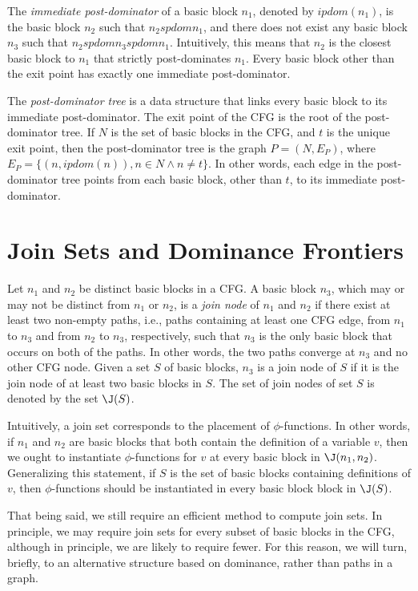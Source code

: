 The \emph{immediate post-dominator} of a basic block $n_{1}$, denoted by
$ipdom(n_{1})$, is the basic block $n_{2}$ such that $n_{2} spdom n_{1}$, and
there does not exist any basic block $n_{3}$ such that
$n_{2} spdom n_{3} spdom n_{1}$. Intuitively, this means that $n_{2}$ is the
closest basic block to $n_{1}$ that strictly post-dominates $n_{1}$.
Every basic block other than the exit point has exactly one immediate 
post-dominator.

The \emph{post-dominator tree} is a data structure that links every
basic block to its immediate post-dominator. The exit point of the CFG is
the root of the post-dominator tree. If $N$ is the set of basic blocks
in the CFG, and $t$ is the unique exit point, then the post-dominator 
tree is the graph $P = (N, E_{P})$, where
$E_{P} = \{(n, ipdom(n)), n \in N \wedge n \neq t\}$. In other words,
each edge in the post-dominator tree points from each basic block, other 
than $t$, to its immediate post-dominator.  

\section{Join Sets and Dominance Frontiers}

Let $n_{1}$ and $n_{2}$ be distinct basic blocks in a CFG. A basic block
$n_{3}$, which may or may not be distinct from $n_{1}$ or $n_{2}$, is 
a \emph{join node} of $n_{1}$ and $n_{2}$ if there exist at least two
non-empty paths, i.e., paths containing at least one CFG edge, from 
$n_{1}$ to $n_{3}$ and from $n_{2}$ to $n_{3}$, respectively, such that
$n_{3}$ is the only basic block that occurs on both of the paths. In
other words, the two paths converge at $n_{3}$ and no other CFG node. 
Given a set $S$ of basic blocks, $n_{3}$ is a join node of $S$ if it
is the join node of at least two basic blocks in $S$. The set of join
nodes of set $S$ is denoted by the set $\J(S)$. 

Intuitively, a join set corresponds to the placement of $\phi$-functions.
In other words, if $n_{1}$ and $n_{2}$ are basic blocks that both
contain the definition of a variable $v$, then we ought to instantiate
$\phi$-functions for $v$ at every basic block in $\J(n_{1}, n_{2})$. 
Generalizing this statement, if $S$ is the set of basic blocks containing
definitions of $v$, then $\phi$-functions should be instantiated in
every basic block block in $\J(S)$. 

That being said, we still require an efficient method to compute join sets. 
In principle, we may require join sets for every subset of basic blocks
in the CFG, although in principle, we are likely to require fewer. For 
this reason, we will turn, briefly, to an alternative structure based
on dominance, rather than paths in a graph.

